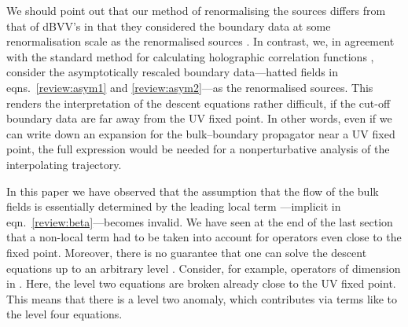 \documentclass[a4paper,12pt]{article}
\begin{document}
We should 
point out that our method of renormalising the sources differs from
that of dBVV's in that they considered the boundary data at some
renormalisation scale \coordHE{} as the renormalised sources \cite{deBoer00a}. 
In contrast, we, in agreement with the standard method for calculating 
holographic correlation functions 
\cite{Witten98-1,Gubser98-1,Freedman99a,Arutyunov00a}, 
consider the asymptotically rescaled boundary
data---hatted fields in eqns.\ \eqref{review:asym1} and
\eqref{review:asym2}---as the renormalised sources. This renders the
interpretation of the descent equations rather difficult, if the cut-off
boundary data are far away from the UV fixed point. In other words, even if
we can write down an expansion for the bulk--boundary propagator \coordHE{} near
a UV fixed point, the full expression would be needed for a nonperturbative
analysis of the interpolating trajectory.




In this paper we have observed that the assumption that the flow of 
the bulk fields is essentially determined by the leading local term
\coordHE{}---implicit in eqn.\ \eqref{review:beta}---becomes invalid. 
We have seen at the end of the last section that
a non-local term had to be taken into account for operators
\coordHE{} even close to the fixed point. Moreover, there is no guarantee
that one can solve the descent equations up to an arbitrary level
\coordHE{}. Consider, for example, operators of dimension \coordHE{} in \coordHE{}. 
Here, the level
two equations are broken already close to the UV fixed point. This
means that there is a level two anomaly, which contributes via terms
like \coordHE{} to the level four
equations.  
\end{document}
